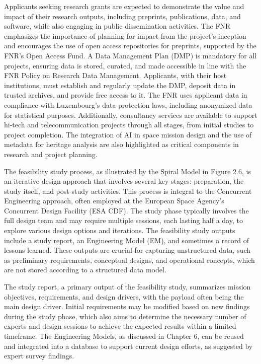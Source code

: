 \documentclass{article}
\begin{document}
Applicants seeking research grants are expected to demonstrate the value and impact of their research outputs, including preprints, publications, data, and software, while also engaging in public dissemination activities. The FNR emphasizes the importance of planning for impact from the project's inception and encourages the use of open access repositories for preprints, supported by the FNR’s Open Access Fund. A Data Management Plan (DMP) is mandatory for all projects, ensuring data is stored, curated, and made accessible in line with the FNR Policy on Research Data Management. Applicants, with their host institutions, must establish and regularly update the DMP, deposit data in trusted archives, and provide free access to it. The FNR uses applicant data in compliance with Luxembourg's data protection laws, including anonymized data for statistical purposes. Additionally, consultancy services are available to support hi-tech and telecommunication projects through all stages, from initial studies to project completion. The integration of AI in space mission design and the use of metadata for heritage analysis are also highlighted as critical components in research and project planning.

The feasibility study process, as illustrated by the Spiral Model in Figure 2.6, is an iterative design approach that involves several key stages: preparation, the study itself, and post-study activities. This process is integral to the Concurrent Engineering approach, often employed at the European Space Agency's Concurrent Design Facility (ESA CDF). The study phase typically involves the full design team and may require multiple sessions, each lasting half a day, to explore various design options and iterations. The feasibility study outputs include a study report, an Engineering Model (EM), and sometimes a record of lessons learned. These outputs are crucial for capturing unstructured data, such as preliminary requirements, conceptual designs, and operational concepts, which are not stored according to a structured data model.

The study report, a primary output of the feasibility study, summarizes mission objectives, requirements, and design drivers, with the payload often being the main design driver. Initial requirements may be modified based on new findings during the study phase, which also aims to determine the necessary number of experts and design sessions to achieve the expected results within a limited timeframe. The Engineering Models, as discussed in Chapter 6, can be reused and integrated into a database to support current design efforts, as suggested by expert survey findings.
\end{document}

